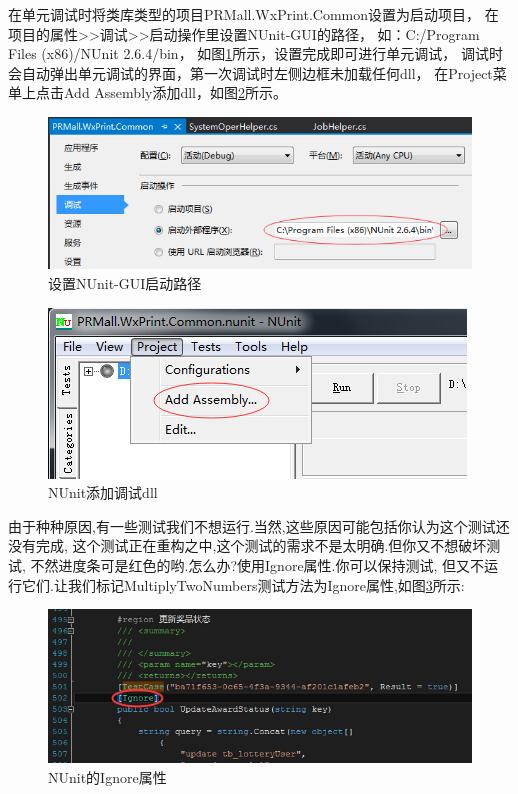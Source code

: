 \documentclass{book}
\begin{document}
在单元调试时将类库类型的项目PRMall.WxPrint.Common设置为启动项目，
在项目的属性>>调试>>启动操作里设置NUnit-GUI的路径，
如：C:/Program Files (x86)/NUnit 2.6.4/bin，
如图\ref{SetNUnitStartUpPath}所示，设置完成即可进行单元调试，
调试时会自动弹出单元调试的界面，第一次调试时左侧边框未加载任何dll，
在Project菜单上点击Add Assembly添加dll，如图\ref{NUnitAddAssembly}所示。

\begin{figure}[htbp]
	\centering
	\includegraphics[scale=0.6]{SetNUnitStartUpPath.jpg}
	\caption{设置NUnit-GUI启动路径}
	\label{SetNUnitStartUpPath}
\end{figure}

\begin{figure}[htbp]
	\centering
	\includegraphics[scale=0.8]{NUnitAddAssembly.jpg}
	\caption{NUnit添加调试dll}
	\label{NUnitAddAssembly}
\end{figure}

由于种种原因,有一些测试我们不想运行.当然,这些原因可能包括你认为这个测试还没有完成,
这个测试正在重构之中,这个测试的需求不是太明确.但你又不想破坏测试,
不然进度条可是红色的哟.怎么办?使用Ignore属性.你可以保持测试,
但又不运行它们.让我们标记MultiplyTwoNumbers测试方法为Ignore属性,如图\ref{fig:UNitIgnoreAttribute}所示: 

\begin{figure}[htbp]
	\centering
	\includegraphics[scale=0.9]{UNitIgnoreAttribute.jpg}
	\caption{NUnit的Ignore属性}
	\label{fig:UNitIgnoreAttribute}
\end{figure}
\end{document}
